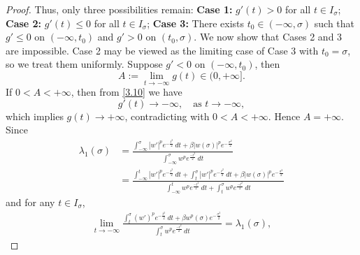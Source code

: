 \documentclass[11pt,leqno]{amsart}
\numberwithin{equation}{section}
\begin{document}
\begin{proof}
 Thus, only three  possibilities remain:
 {\bf Case 1:} $g'(t)>0$ for all $t\in I_\sigma$;
   {\bf Case 2:} $g'(t)\le 0$ for all $t\in I_\sigma$;
   {\bf Case 3:} There exists $t_0\in (-\infty, \sigma)$ such that
 $g'\le 0$ on $(-\infty, t_0)$ and $g'>0$ on $(t_0, \sigma)$. 
We now show that Cases 2 and 3 are impossible. Case 2 may be viewed as the limiting case of Case 3 with $t_0=\sigma$, so we treat them uniformly. Suppose $g'<0$ on $(-\infty, t_0)$, then 
$$
A:=\lim_{t\rightarrow -\infty}g(t)\in (0, +\infty].
$$
If $0<A<+\infty$,  then from \eqref{3.10} we have
$$
g'(t)\to -\infty, \quad \text{as $t \to -\infty$},
$$
which implies $g(t)\to +\infty$, contradicting with $0<A<+\infty$.
Hence $A=+\infty$.  Since
\begin{align*}
    \lambda_1(\sigma)& = \frac{\int_{-\infty}^{\sigma} |w'|^p e^{-\frac{t^2}{2}} \, dt + \beta |w(\sigma)|^pe^{-\frac{\sigma^2}{2}}}{\int_{-\infty}^{\sigma} w^p e^{\frac{-t^2}{2}} \, dt}\\
&= \frac{\int_{-\infty}^{t} |w'|^p e^{-\frac{t^2}{2}} \, dt + \int_{t}^{\sigma} |w'|^p e^{-\frac{t^2}{2}} \, dt + \beta |w(\sigma)|^p e^{-\frac{\sigma^2}{2}} }{\int_{-\infty}^{t} w^p e^{\frac{-t^2}{2}}\, dt + \int_{t}^{\sigma} w^p e^{\frac{-t^2}{2}}\, dt}
\end{align*}
 and for any $t\in I_\sigma$,
\begin{align*}
    \lim_{t\rightarrow-\infty}\frac{ \int_{t}^{\sigma} (w')^p e^{-\frac{t^2}{2}} \, dt + \beta w^p(\sigma) e^{-\frac{\sigma^2}{2}} }{\int_{t}^{\sigma} w^p e^{\frac{-t^2}{2}}\, dt}=\lambda_1(\sigma),
\end{align*}

\end{proof}
\end{document}
